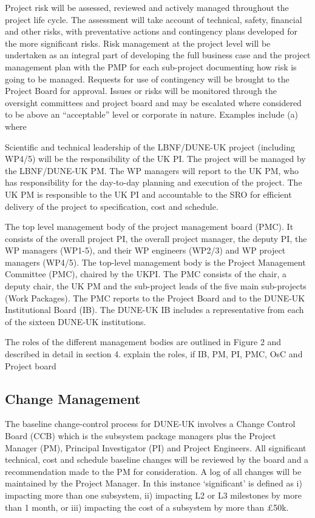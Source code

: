 Project risk will be assessed, reviewed and actively managed throughout the project life cycle. The assessment will take account of technical, safety, financial and other risks, with preventative actions and contingency plans developed for the more significant risks. Risk management at the project level will be undertaken as an integral part of developing the full business case and the project management plan with the PMP for each sub-project documenting how risk is going to be managed. Requests for use of contingency will be brought to the Project Board for approval. Issues or risks will be monitored through the oversight committees and project board and may be escalated where considered to be above an “acceptable” level or corporate in nature. Examples include (a) where

Scientific and technical leadership of the LBNF/DUNE-UK project (including WP4/5) will be the responsibility of the UK PI. The project will be managed by the LBNF/DUNE-UK PM. The WP managers will report to the UK PM, who has responsibility for the day-to-day planning and execution of the project. The UK PM is responsible to the UK PI and accountable to the SRO for efficient delivery of the project to specification, cost and schedule.

The top level management body of the project management board (PMC). It consists of the overall project PI, the overall project manager, the deputy PI, the WP managers (WP1-5), and their WP engineers (WP2/3) and WP project managers (WP4/5).
The top-level management body is the Project Management Committee (PMC), chaired by the UKPI. The PMC consists of the chair, a deputy chair, the UK PM and the sub-project leads of the five main sub-projects (Work Packages). The PMC reports to the Project Board and to the DUNE-UK Institutional Board (IB). The DUNE-UK IB includes a representative from each of the sixteen DUNE-UK institutions.

The roles of the different management bodies are outlined in Figure 2 and described in detail in section 4.
explain the roles, if IB\cite{IB}, PM, PI, PMC, OsC and Project board

\subsection{Change Management}
The baseline change-control process for DUNE-UK involves a Change Control Board (CCB) which is the subsystem package managers plus the Project Manager (PM), Principal Investigator (PI) and Project Engineers. All significant technical, cost and schedule baseline changes will be reviewed by the board and a recommendation made to the PM for consideration. A log of all changes will be maintained by the Project Manager. In this instance ‘significant’ is defined as i) impacting more than one subsystem, ii) impacting L2 or L3 milestones by more than 1 month, or iii) impacting the cost of a subsystem by more than £50k.

